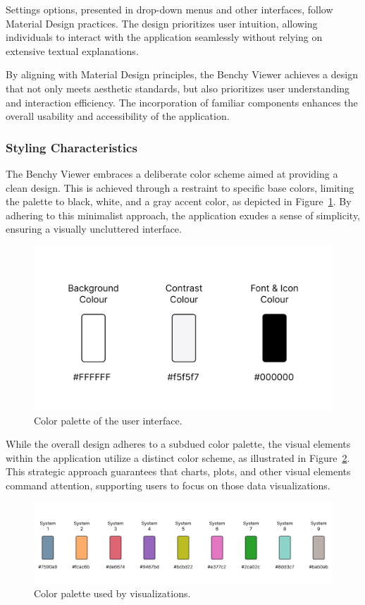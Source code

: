 Settings options, presented in drop-down menus and other interfaces, follow Material Design practices. The design prioritizes user intuition, allowing individuals to interact with the application seamlessly without relying on extensive textual explanations.

By aligning with Material Design principles, the Benchy Viewer achieves a design that not only meets aesthetic standards, but also prioritizes user understanding and interaction efficiency. The incorporation of familiar components enhances the overall usability and accessibility of the application.


\subsubsection{Styling Characteristics}

The Benchy Viewer embraces a deliberate color scheme aimed at providing a clean design. This is achieved through a restraint to specific base colors, limiting the palette to black, white, and a gray accent color, as depicted in Figure~\ref{fig:colors}. By adhering to this minimalist approach, the application exudes a sense of simplicity, ensuring a visually uncluttered interface.



\begin{figure}[h]
  \centering
  \includegraphics[width=0.4\linewidth]{figures/colors.png}
  \caption{Color palette of the user interface.}
  \label{fig:colors}
\end{figure}

While the overall design adheres to a subdued color palette, the visual elements within the application utilize a distinct color scheme, as illustrated in Figure~\ref{fig:colors-dbms}. This strategic approach guarantees that charts, plots, and other visual elements command attention, supporting users to focus on those data visualizations.

\begin{figure}[h]
  \centering
  \includegraphics[width=1\linewidth]{figures/colors-dbms.png}
  \caption{Color palette used by visualizations.}
  \label{fig:colors-dbms}
\end{figure}

